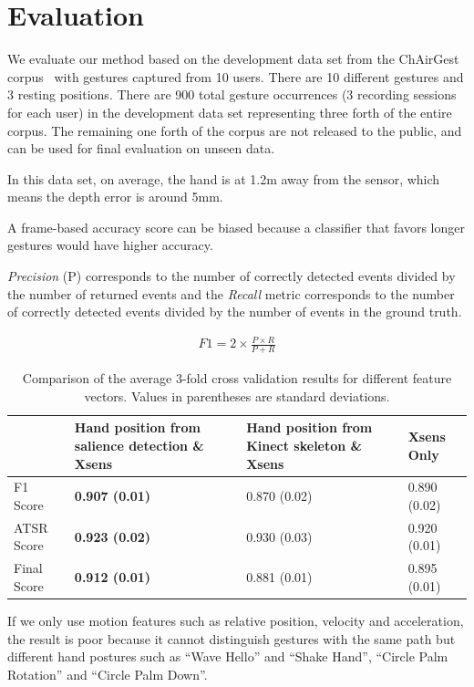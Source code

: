 \chapter{Evaluation}
We evaluate our method based on the development data set from the ChAirGest
corpus~\cite{Ruffieux2013} with gestures captured from 10 users. There are
10 different gestures and 3 resting positions. There are 900 total gesture
occurrences (3 recording sessions for each user) in the development data set representing three forth of the entire corpus. The remaining one forth of the corpus are not released to
the public, and can be used for final evaluation on unseen data.

In this data set, on average, the hand is at 1.2m away
from the sensor, which means the depth error is around 5mm.

A frame-based accuracy score can be biased because a classifier that
favors longer gestures would have higher accuracy.

\textit{Precision} (P) corresponds to the number of correctly detected events
divided by the number of returned events and the \textit{Recall} metric
corresponds to the number of correctly detected events divided by the number of
events in the ground truth. \cite{Ruffieux2013}

\begin{align}
F1 = 2\times\frac{P \times R}{P + R}
\end{align}

\begin{table}[h]
\begin{center}
\begin{tabular}{|l|p{2cm}|p{1.7cm}|p{1.7cm}|}
\hline
 & Hand position from salience detection \& Xsens & Hand position
 from Kinect skeleton \& Xsens & Xsens Only \\
\hline
F1 Score & \textbf{0.907 (0.01)} & 0.870 (0.02) & 0.890 (0.02) \\
\hline
ATSR Score & \textbf{0.923 (0.02)} & 0.930 (0.03) & 0.920 (0.01) \\
\hline
Final Score & \textbf{0.912 (0.01)} & 0.881 (0.01) & 0.895 (0.01) \\
\hline
\end{tabular}
\caption{Comparison of the average 3-fold cross validation results for different
feature vectors. Values in parentheses are standard deviations.}
\label{tab:comp-feature}
\end{center}
\end{table}

If we only use motion features such as relative position, velocity and
acceleration, the result is poor because it cannot distinguish gestures with
the same path but different hand postures such as ``Wave Hello'' and ``Shake
Hand'', ``Circle Palm Rotation'' and ``Circle Palm Down''.

